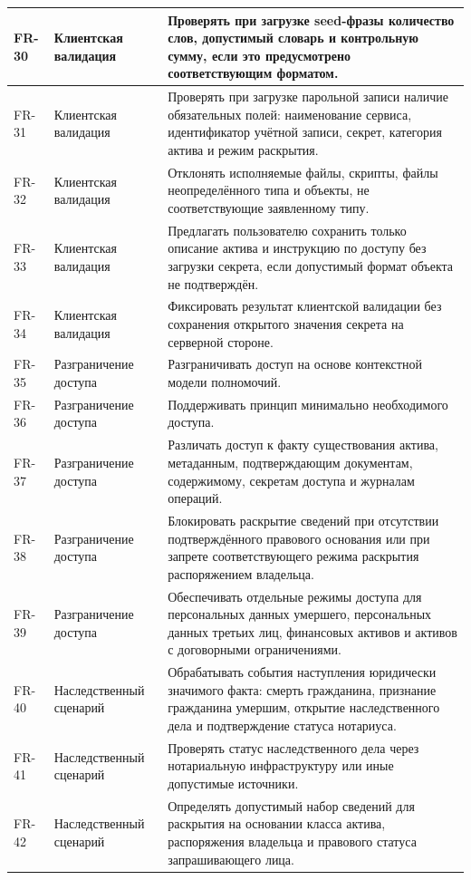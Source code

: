 \begin{longtable}{|P{1.45cm}|P{3.35cm}|P{10.7cm}|}
FR-30 & Клиентская валидация & Проверять при загрузке seed-фразы количество слов, допустимый словарь и контрольную сумму, если это предусмотрено соответствующим форматом.\\ \hline
FR-31 & Клиентская валидация & Проверять при загрузке парольной записи наличие обязательных полей: наименование сервиса, идентификатор учётной записи, секрет, категория актива и режим раскрытия.\\ \hline
FR-32 & Клиентская валидация & Отклонять исполняемые файлы, скрипты, файлы неопределённого типа и объекты, не соответствующие заявленному типу.\\ \hline
FR-33 & Клиентская валидация & Предлагать пользователю сохранить только описание актива и инструкцию по доступу без загрузки секрета, если допустимый формат объекта не подтверждён.\\ \hline
FR-34 & Клиентская валидация & Фиксировать результат клиентской валидации без сохранения открытого значения секрета на серверной стороне.\\ \hline
FR-35 & Разграничение доступа & Разграничивать доступ на основе контекстной модели полномочий.\\ \hline
FR-36 & Разграничение доступа & Поддерживать принцип минимально необходимого доступа.\\ \hline
FR-37 & Разграничение доступа & Различать доступ к факту существования актива, метаданным, подтверждающим документам, содержимому, секретам доступа и журналам операций.\\ \hline
FR-38 & Разграничение доступа & Блокировать раскрытие сведений при отсутствии подтверждённого правового основания или при запрете соответствующего режима раскрытия распоряжением владельца.\\ \hline
FR-39 & Разграничение доступа & Обеспечивать отдельные режимы доступа для персональных данных умершего, персональных данных третьих лиц, финансовых активов и активов с договорными ограничениями.\\ \hline
FR-40 & Наследственный сценарий & Обрабатывать события наступления юридически значимого факта: смерть гражданина, признание гражданина умершим, открытие наследственного дела и подтверждение статуса нотариуса.\\ \hline
FR-41 & Наследственный сценарий & Проверять статус наследственного дела через нотариальную инфраструктуру или иные допустимые источники.\\ \hline
FR-42 & Наследственный сценарий & Определять допустимый набор сведений для раскрытия на основании класса актива, распоряжения владельца и правового статуса запрашивающего лица.\\ \hline

\end{longtable}
